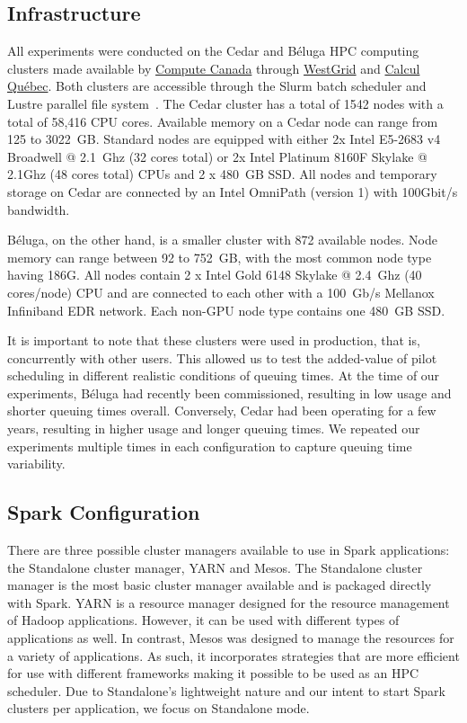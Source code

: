 \documentclass{IEEEtran}
\begin{document}
    \subsection{Infrastructure}
    All experiments were conducted on the Cedar and B\'eluga HPC computing
    clusters made available by \href{https://www.computecanada.ca}{Compute
    Canada} through \href{https://www.westgrid.ca}{WestGrid} and
    \href{http://www.calculquebec.ca}{Calcul Qu\'ebec}. Both clusters are
    accessible through the Slurm batch scheduler and Lustre parallel file
    system~\cite{schwan2003lustre}. The Cedar cluster has a total of 1542
    nodes with a total of 58,416 CPU cores. Available memory on a Cedar
    node can range from 125 to 3022~GB. Standard nodes are equipped with
    either 2x Intel E5-2683 v4 Broadwell @ 2.1~Ghz (32 cores total) or 2x
    Intel Platinum 8160F Skylake @ 2.1Ghz (48 cores total) CPUs and 2 x
    480~GB SSD. All nodes and temporary storage on Cedar are connected by an
    Intel OmniPath (version 1) with 100Gbit/s bandwidth.

    B\'eluga, on the other hand, is a smaller cluster with 872 available
    nodes. Node memory can range between 92 to 752~GB, with the most common
    node type having 186G. All nodes contain 2 x Intel Gold 6148 Skylake @
    2.4~Ghz (40 cores/node) CPU and are connected to each other with a
    100~Gb/s Mellanox Infiniband EDR network. Each non-GPU
    node type contains one 480~GB SSD. 

    It is important to note that these clusters were used in production,
    that is, concurrently with other users. This allowed us to test the
    added-value of pilot scheduling in different realistic conditions of queuing
    times. At the time of our experiments, B\'eluga had recently been
    commissioned, resulting in low usage and shorter queuing times overall.
    Conversely, Cedar had been operating for a few years, resulting in
    higher usage and longer queuing times. We repeated our experiments multiple 
    times in each configuration to capture queuing time variability.

    \subsection{Spark Configuration}

    There are three possible cluster managers available to use in Spark applications:
    the Standalone cluster manager, YARN and Mesos. The Standalone cluster manager is the
    most basic cluster manager available and is packaged directly with Spark. YARN is a
    resource manager designed for the resource management of Hadoop applications. However,
    it can be used with different types of applications as well. In contrast, Mesos was 
    designed to manage the resources for a variety of applications. As such, it incorporates
    strategies that are more efficient for use with different frameworks making it possible
    to be used as an HPC scheduler. Due to Standalone's lightweight nature and our intent
    to start Spark clusters per application, we focus on Standalone mode.
\end{document}
